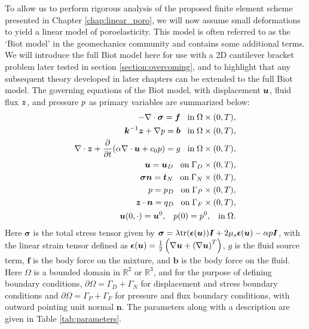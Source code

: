 To allow us to perform rigorous analysis of the proposed finite element scheme presented in Chapter \ref{chap:linear_poro}, we will now assume small deformations to yield a linear model of poroelasticity. This model is often referred to as the `Biot model' in the geomechanics community and contains some additional terms. We will introduce the full Biot model here for use with a 2D cantilever bracket problem later tested in section \ref{section:overcoming}, and to highlight that any subsequent theory developed in later chapters can be extended to the full Biot model. The governing equations of the Biot model, with displacement $\boldsymbol{u}$, fluid flux $\boldsymbol{z}$, and pressure $p$ as primary variables are summarized below:  
\begin{subequations}
\begin{align}
\label{eqn:strong_mixture_momentum}
- \nabla \cdot \boldsymbol{\sigma}  =\boldsymbol{f} \;\;\; \mbox{in}\; \Omega \times (0,T),\\
{\boldsymbol{k}^{-1}\boldsymbol{z}} + \nabla p =  \boldsymbol{b} \;\;\; \mbox{in}\; \Omega\times (0,T), \\
\nabla \cdot \boldsymbol{z} + \frac{\partial }{\partial t}(\alpha\nabla \cdot \boldsymbol{u} + c_{0} p )  = g   \;\;\; \mbox{in}\; \Omega \times (0,T),
\\
\boldsymbol{u} =\boldsymbol{u}_{D}   \;\;\; \mbox{on}\; \Gamma_{D} \times (0,T),
\\
\boldsymbol{\sigma}\boldsymbol{n} = \boldsymbol{t}_{N}   \;\;\; \mbox{on}\; \Gamma_{N} \times (0,T),
\\
p = p_{D}   \;\;\; \mbox{on}\; \Gamma_{P} \times (0,T),
\\
\boldsymbol{z}\cdot \boldsymbol{n} = {q_{D}}   \;\;\; \mbox{on}\; \Gamma_{F} \times (0,T),
\\
\boldsymbol{u}(0,\cdot) = \boldsymbol{u}^{0},  \;\;\; p(0) = p^{0}, \;\;\; \mbox{in}\; \Omega.
\end{align}
\label{eqn:strong_cont_system_biot}
\end{subequations}
Here $\mathbf{\sigma}$ is the total stress tensor given by $\boldsymbol{\sigma}=\lambda \mbox{tr}(\boldsymbol{\epsilon}(\boldsymbol{u}))\boldsymbol{I} + 2\mu_{s}\boldsymbol{\epsilon}(\boldsymbol{u})-\alpha p\boldsymbol{I}$, with the linear strain tensor defined as $\boldsymbol{\epsilon}(\boldsymbol{u})=\frac{1}{2}\left(\nabla \boldsymbol{u} + \left( \nabla \boldsymbol{u} \right)^{T} \right)$, $g$ is the fluid source term, $\mathbf{f}$ is the body force on the mixture, and $\mathbf{b}$ is the body force on the fluid.  Here $\Omega$ is a bounded domain in $\mathbb{R}^{2}$ or $\mathbb{R}^{3}$, and for the purpose of defining boundary conditions, $\partial\Omega=\Gamma_D+\Gamma_N$ for displacement and stress boundary conditions and  $\partial\Omega=\Gamma_P+\Gamma_F$ for pressure and flux boundary conditions, with outward pointing unit normal $\mathbf{n}$. The parameters along with a description are given in Table \ref{tab:parameters}.
